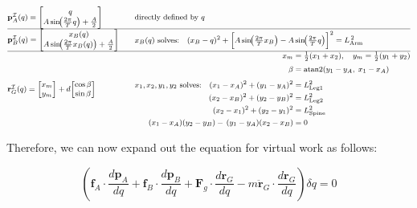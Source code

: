 \documentclass[11pt]{article}
\begin{document}
\[
\footnotesize
\setlength{\arraycolsep}{6pt}   %
\renewcommand{\arraystretch}{1.05}%
\begin{array}{@{}l@{\qquad}l@{}}
\mathbf{p}_A^\mathcal{I}(q)=
\begin{bmatrix}
q\\
A\sin\!\bigl(\tfrac{2\pi}{T}q\bigr)+\tfrac{A}{2}
\end{bmatrix}
&
\text{directly defined by } q
\\[.8em]
\noalign{\hrule height 0.35pt}
\mathbf{p}_B^\mathcal{I}(q)=
\begin{bmatrix}
x_B(q)\\
A\sin\!\bigl(\tfrac{2\pi}{T}x_B(q)\bigr)+\tfrac{A}{2}
\end{bmatrix}
&
\begin{aligned}
x_B(q)\ \text{solves:}\quad
(x_B-q)^2
&+\Bigl[A\sin\!\bigl(\tfrac{2\pi}{T}x_B\bigr)
      -A\sin\!\bigl(\tfrac{2\pi}{T}q\bigr)\Bigr]^2
      =L_{\text{Arm}}^{\,2}
\end{aligned}
\\[.8em]
\noalign{\hrule height 0.35pt}
\mathbf{r}_G^\mathcal{I}(q)=
\begin{bmatrix}
x_m\\
y_m
\end{bmatrix}
+
d\!
\begin{bmatrix}
\cos\beta\\
\sin\beta
\end{bmatrix}
&
\begin{aligned}
x_m &=\tfrac12(x_1+x_2),\quad
y_m=\tfrac12(y_1+y_2)\\[2pt]
\beta &=\operatorname{atan2}(y_1-y_A,\;x_1-x_A)\\[4pt]
x_1, x_2, y_1, y_2\ \text{solves:}\quad
(x_1-x_A)^2+(y_1-y_A)^2 &=L_{\text{Leg}1}^2\\
(x_2-x_B)^2+(y_2-y_B)^2 &=L_{\text{Leg}2}^2\\
(x_2-x_1)^2+(y_2-y_1)^2 &=L_{\text{Spine}}^2\\
(x_1-x_A)(y_2-y_B) -\,(y_1-y_A)(x_2-x_B)&=0
\end{aligned}
\end{array}
\]

Therefore, we can now expand out the equation for virtual work as follows:

\[
\left(
\mathbf{f}_A \cdot \frac{d\mathbf{p}_A}{dq}
+ \mathbf{f}_B \cdot \frac{d\mathbf{p}_B}{dq}
+ \mathbf{F}_g \cdot \frac{d\mathbf{r}_G}{dq}
- m \ddot{\mathbf{r}}_G \cdot \frac{d\mathbf{r}_G}{dq}
\right)
\delta q = 0
\]
\end{document}
